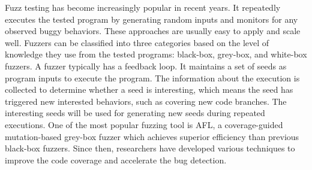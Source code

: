 

Fuzz testing has become increasingly popular in recent years. It repeatedly executes the tested program by generating random inputs and monitors for any observed buggy behaviors. These approaches are usually easy to apply and scale well. Fuzzers can be classified into three categories based on the level of knowledge they use from the tested programs: black-box, grey-box, and white-box fuzzers. A fuzzer typically has a feedback loop. It maintains a set of seeds as program inputs to execute the program. The information about the execution is collected to determine whether a seed is interesting, which means the seed has triggered new interested behaviors, such as covering new code branches. The interesting seeds will be used for generating new seeds during repeated executions. One of the most popular fuzzing tool is AFL\cite{afl}, a coverage-guided mutation-based grey-box fuzzer which achieves superior efficiency than previous black-box fuzzers. Since then, researchers have developed various techniques to improve the code coverage and accelerate the bug detection. 

